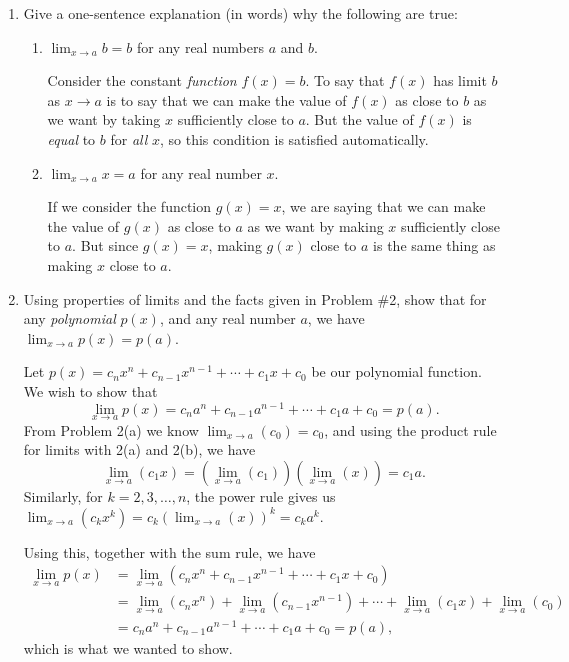 \documentclass[12pt]{article}
\newcommand{\di}{\displaystyle}
\begin{document}
\begin{enumerate}
\bigskip

\item Give a one-sentence explanation (in words) why the following are true:
\begin{enumerate}
 \item $\di \lim_{x\to a} b = b$ for any real numbers $a$ and $b$.

\medskip

Consider the constant \textit{function} $f(x)=b$. To say that $f(x)$ has limit $b$ as $x\to a$ is to say that we can make the value of $f(x)$ as close to $b$ as we want by taking $x$ sufficiently close to $a$. But the value of $f(x)$ is \textit{equal} to $b$ for \textit{all} $x$, so this condition is satisfied automatically.

 \item $\di \lim_{x\to a} x = a$ for any real number $x$.

\medskip

If we consider the function $g(x)=x$, we are saying that we can make the value of $g(x)$ as close to $a$ as we want by making $x$ sufficiently close to $a$. But since $g(x)=x$, making $g(x)$ close to $a$ is the same thing as making $x$ close to $a$.
\end{enumerate}

\newpage

\item Using properties of limits and the facts given in Problem \#2, show that for any \textit{polynomial} $p(x)$, and any real number $a$, we have $\di \lim_{x\to a}p(x)=p(a)$.

\bigskip

Let $p(x)=c_nx^n+c_{n-1}x^{n-1}+\cdots + c_1x+c_0$ be our polynomial function. We wish to show that
\[
 \lim_{x\to a}p(x) = c_na^n+c_{n-1}a^{n-1}+\cdots + c_1a+c_0 = p(a).
\]
From Problem 2(a) we know $\di\lim_{x\to a}(c_0)=c_0$, and using the product rule for limits with 2(a) and 2(b), we have
\[
 \lim_{x\to a}(c_1x) = (\lim_{x\to a}(c_1))(\lim_{x\to a}(x)) = c_1a.
\]
Similarly, for $k=2, 3, \ldots, n$, the power rule gives us $\di\lim_{x\to a}(c_kx^k) = c_k\left(\lim_{x\to a}(x)\right)^k = c_ka^k$. 

Using this, together with the sum rule, we have
\begin{align*}
 \lim_{x\to a}p(x) & = \lim_{x\to a}(c_nx^n+c_{n-1}x^{n-1}+\cdots + c_1x+c_0)\\
 & = \lim_{x\to a}(c_nx^n) + \lim_{x\to a}(c_{n-1}x^{n-1}) + \cdots + \lim_{x\to a}(c_1x) + \lim_{x\to a}(c_0)\\
 & = c_na^n + c_{n-1}a^{n-1}+\cdots + c_1a+c_0 = p(a), 
\end{align*}
which is what we wanted to show.


\end{enumerate}
\end{document}
